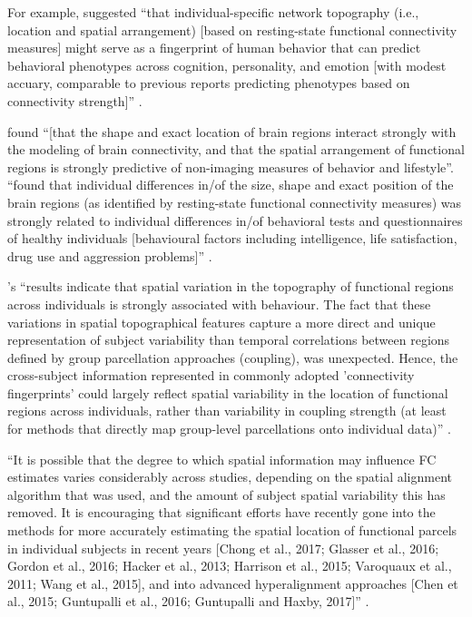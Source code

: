 %
For example, \citet{kong2019spatial} suggested ``that individual-specific network
topography (i.e., location and spatial arrangement) [based on resting-state
functional connectivity measures] might serve as a fingerprint of human
behavior that can predict behavioral phenotypes across cognition, personality,
and emotion [with modest accuary, comparable to previous reports predicting
phenotypes based on connectivity strength]'' \citep{kong2019spatial}.

%
\citet{bijsterbosch2018relationship} found ``[that the shape and exact location
of brain regions interact strongly with the modeling of brain connectivity, and
that the spatial arrangement of functional regions is strongly predictive of
non-imaging measures of behavior and lifestyle''.
%
\citet{bijsterbosch2018relationship} ``found that individual differences in/of
the size, shape and exact position of the brain regions (as identified by
resting-state functional connectivity measures) was strongly related to
individual differences in/of behavioral tests and questionnaires of healthy
individuals [behavioural factors including intelligence, life satisfaction, drug
use and aggression problems]'' \citep{bijsterbosch2018relationship}.

\citep{bijsterbosch2018relationship}'s ``results indicate that spatial variation
in the topography of functional regions across individuals is strongly
associated with behaviour.
%
The fact that these variations in spatial topographical features capture a more
direct and unique representation of subject variability than temporal
correlations between regions defined by group parcellation approaches
(coupling), was unexpected.
%
Hence, the cross-subject information represented in commonly adopted
'connectivity fingerprints' could largely reflect spatial variability in the
location of functional regions across individuals, rather than variability in
coupling strength (at least for methods that directly map group-level
parcellations onto individual data)'' \citep{bijsterbosch2018relationship}.

%
``It is possible that the degree to which spatial information may influence FC
estimates varies considerably across studies, depending on the spatial alignment
algorithm that was used, and the amount of subject spatial variability this has
removed.
%
It is encouraging that significant efforts have recently gone into the methods
for more accurately estimating the spatial location of functional parcels in
individual subjects in recent years [Chong et al., 2017; Glasser et al., 2016;
Gordon et al., 2016; Hacker et al., 2013; Harrison et al., 2015; Varoquaux et
al., 2011; Wang et al., 2015], and into advanced hyperalignment approaches [Chen
et al., 2015; Guntupalli et al., 2016; Guntupalli and Haxby, 2017]''
\citep{bijsterbosch2018relationship}.


